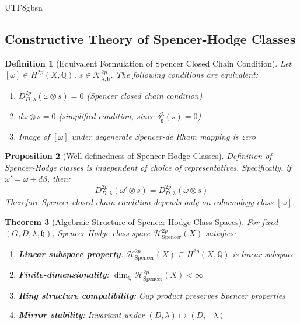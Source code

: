 \documentclass[a4paper,12pt]{extarticle}
\newtheorem{theorem}{Theorem}[section]
\newtheorem{proposition}[theorem]{Proposition}
\newtheorem{definition}[theorem]{Definition}
\theoremstyle{definition}
\begin{document}
\begin{CJK}{UTF8}{gbsn}
\subsection{Constructive Theory of Spencer-Hodge Classes}
\label{appendix:subsec_spencer_hodge_constructive}

\begin{definition}[Equivalent Formulation of Spencer Closed Chain Condition]
\label{appendix:def_spencer_closed_chain}
Let $[\omega] \in H^{2p}(X,\mathbb{Q})$, $s \in \mathcal{K}^{2p}_{\lambda,\mathfrak{h}}$. The following conditions are equivalent:
\begin{enumerate}
    \item $D^{2p}_{D,\lambda}(\omega \otimes s) = 0$ (Spencer closed chain condition)
    \item $d\omega \otimes s = 0$ (simplified condition, since $\delta^\lambda_\mathfrak{g}(s) = 0$)
    \item Image of $[\omega]$ under degenerate Spencer-de Rham mapping is zero
\end{enumerate}
\end{definition}

\begin{proposition}[Well-definedness of Spencer-Hodge Classes]
\label{appendix:prop_well_defined}
Definition of Spencer-Hodge classes is independent of choice of representatives. Specifically, if $\omega' = \omega + d\beta$, then:
$$D^{2p}_{D,\lambda}(\omega' \otimes s) = D^{2p}_{D,\lambda}(\omega \otimes s)$$
Therefore Spencer closed chain condition depends only on cohomology class $[\omega]$.
\end{proposition}

\begin{theorem}[Algebraic Structure of Spencer-Hodge Class Spaces]
\label{appendix:thm_spencer_hodge_algebra}
For fixed $(G,D,\lambda,\mathfrak{h})$, Spencer-Hodge class space $\mathcal{H}^{2p}_{\text{Spencer}}(X)$ satisfies:
\begin{enumerate}
    \item \textbf{Linear subspace property}: $\mathcal{H}^{2p}_{\text{Spencer}}(X) \subseteq H^{2p}(X,\mathbb{Q})$ is linear subspace
    \item \textbf{Finite-dimensionality}: $\dim_{\mathbb{Q}} \mathcal{H}^{2p}_{\text{Spencer}}(X) < \infty$
    \item \textbf{Ring structure compatibility}: Cup product preserves Spencer properties
    \item \textbf{Mirror stability}: Invariant under $(D,\lambda) \mapsto (D,-\lambda)$
\end{enumerate}
\end{theorem}


\end{CJK}
\end{document}
